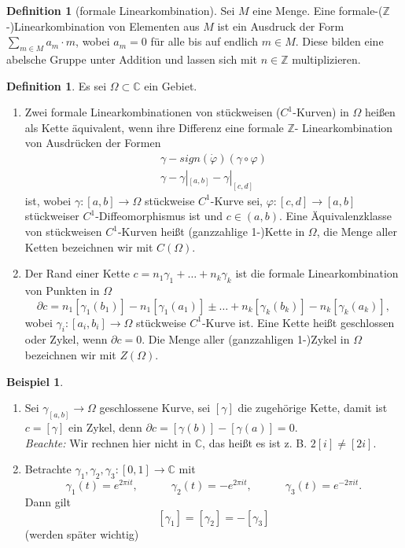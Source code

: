 \documentclass[11pt,titlepage]{article}
\theoremstyle{definition}
\newtheorem{definition}[theorem]{Definition}
\newtheorem{example}[theorem]{Beispiel}
\theoremstyle{remark}
\begin{document}
	\begin{definition}[formale Linearkombination]
		Sei $M$ eine Menge. Eine formale-($\mathbb{Z}$-)Linearkombination von Elementen aus $M$ 
		ist ein Ausdruck der Form $\sum_{m\in M} a_m \cdot m$, wobei $a_m =0$ für alle bis auf endlich 
		$m\in M$. Diese bilden eine abelsche Gruppe unter Addition und lassen sich mit $n\in\mathbb{Z}$ 
		multiplizieren.
	\end{definition}
	
	\begin{definition} \label{def:Kette}
		Es sei $\Omega\subset\mathbb{C}$ ein Gebiet. 
		\begin{enumerate}
			\item \label{def:Kette1}
			Zwei formale Linearkombinationen von stückweisen ($C^1$-Kurven) in $\Omega$ 
			heißen als Kette äquivalent, wenn ihre Differenz eine formale $\mathbb{Z}$-
			Linearkombination von Ausdrücken der Formen 
			\begin{eqnarray*}
				\gamma -sign(\dot{\varphi})(\gamma \circ\varphi) \\
				\gamma -\gamma|_{[a,b]} -\gamma|_{[c,d]} 
			\end{eqnarray*}
			ist, wobei $\gamma:[a,b]\to\Omega$ stückweise $C^1$-Kurve sei, 
			$\varphi:[c,d]\to [a,b]$ stückweiser $C^1$-Diffeomorphismus ist und $c\in (a,b)$. 
			Eine Äquivalenzklasse von stückweisen $C^1$-Kurven heißt 
			(ganzzahlige 1-)Kette in $\Omega$, die Menge aller Ketten bezeichnen wir mit 
			$C(\Omega)$.
			
			\item Der Rand einer Kette $c=n_1 \gamma_1 +\ldots+n_k\gamma_k$ ist die formale 
			Linearkombination von Punkten in $\Omega$ 
			\[ \partial c=n_1 [\gamma_1(b_1)]-n_1[\gamma_1(a_1)] \pm\ldots +n_k[\gamma_k(b_k)]-
			n_k[\gamma_k(a_k)], \]
			wobei $\gamma_i :[a_i,b_i]\to\Omega$ stückweise $C^1$-Kurve ist. 
			Eine Kette heißt geschlossen oder Zykel, wenn $\partial c=0$. Die Menge aller 
			(ganzzahligen 1-)Zykel in $\Omega$ bezeichnen wir mit $Z(\Omega)$.
		\end{enumerate}
	\end{definition}
	
	\begin{example}
		\begin{enumerate}
			\item Sei $\gamma_[a,b]\to\Omega$ geschlossene Kurve, sei $[\gamma]$ die 
			zugehörige Kette, damit ist $c=[\gamma]$ ein Zykel, denn 
			$\partial c =[\gamma(b)]-[\gamma(a)]=0$. \\
			\textsl{Beachte:} Wir rechnen hier nicht in $\mathbb{C}$, das heißt es ist z. B. 
			$2[i]\neq [2i]$.
			
			\item Betrachte $\gamma_1 ,\gamma_2 ,\gamma_3 :[0,1]\to\mathbb{C}$ mit 
			\[\gamma_1(t)=e^{2\pi it},\qquad\quad \gamma_2(t)=-e^{2\pi it},
			\qquad\quad\gamma_3(t)=e^{-2\pi it}.\] 
			Dann gilt
			\[ [\gamma_1]=[\gamma_2]=-[\gamma_3]\]
			(werden später wichtig)
		\end{enumerate}
	\end{example}
	
\end{document}
